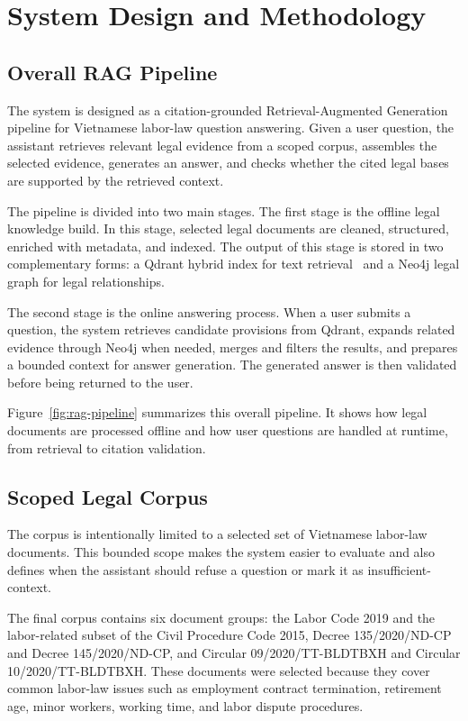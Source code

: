 \section{System Design and Methodology}

\subsection{Overall RAG Pipeline}
The system is designed as a citation-grounded Retrieval-Augmented Generation pipeline for Vietnamese labor-law question answering. Given a user question, the assistant retrieves relevant legal evidence from a scoped corpus, assembles the selected evidence, generates an answer, and checks whether the cited legal bases are supported by the retrieved context.

The pipeline is divided into two main stages. The first stage is the offline legal knowledge build. In this stage, selected legal documents are cleaned, structured, enriched with metadata, and indexed. The output of this stage is stored in two complementary forms: a Qdrant hybrid index for text retrieval~\cite{qdrantdocs} and a Neo4j legal graph for legal relationships.

The second stage is the online answering process. When a user submits a question, the system retrieves candidate provisions from Qdrant, expands related evidence through Neo4j when needed, merges and filters the results, and prepares a bounded context for answer generation. The generated answer is then validated before being returned to the user.

Figure~\ref{fig:rag-pipeline} summarizes this overall pipeline. It shows how legal documents are processed offline and how user questions are handled at runtime, from retrieval to citation validation.


\subsection{Scoped Legal Corpus}
The corpus is intentionally limited to a selected set of Vietnamese labor-law documents. This bounded scope makes the system easier to evaluate and also defines when the assistant should refuse a question or mark it as insufficient-context.

The final corpus contains six document groups: the Labor Code 2019 and the labor-related subset of the Civil Procedure Code 2015, Decree 135/2020/ND-CP and Decree 145/2020/ND-CP, and Circular 09/2020/TT-BLDTBXH and Circular 10/2020/TT-BLDTBXH. These documents were selected because they cover common labor-law issues such as employment contract termination, retirement age, minor workers, working time, and labor dispute procedures.

